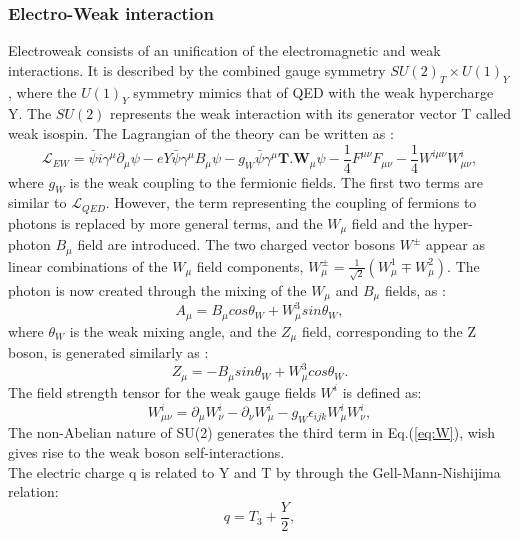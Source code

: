 \subsubsection{Electro-Weak interaction}
Electroweak consists of an unification of the electromagnetic and weak interactions. It is described by the combined gauge symmetry $SU(2)_{T}\times U(1)_{Y}$, where the $U(1)_{Y}$ symmetry mimics that of QED with the weak hypercharge Y. The $SU(2)$ represents the weak interaction with its generator vector T called weak isospin. The Lagrangian of the theory can be written as : 
\begin{equation}
    \mathcal{L}_{EW} = \bar{\psi}i\gamma^\mu\partial_\mu\psi -eY\bar{\psi}\gamma^{\mu}B_{\mu}\psi-g_{W}\bar{\psi}\gamma^{\mu}\textbf{T.W$_\mu$}\psi
    -\frac{1}{4}F^{\mu\nu}F_{\mu\nu} - \frac{1}{4}W^{i\mu\nu}W^i_{\mu\nu},
\end{equation}
where $g_{W}$ is the weak coupling to the fermionic fields. The first two terms are similar to $\mathcal{L}_{QED}$. However, the term representing the coupling of fermions to photons is replaced by more general terms, and the $W_{\mu}$ field and the hyper-photon $B_{\mu}$ field are introduced. The two charged vector bosons $W^\pm$ appear as linear combinations of the $W_{\mu}$ field components, $W^{\pm}_{\mu} = \frac{1}{\sqrt{2}}(W^1_{\mu}\mp W^2_{\mu})$. The photon is now created through the mixing of the $W_{\mu}$ and $B_{\mu}$ fields, as :
\begin{equation}
    A_{\mu} = B_{\mu}cos\theta_{W} + W^3_{\mu}sin\theta_{W},
\end{equation}
where $\theta_{W}$ is the weak mixing angle, and the $Z_{\mu}$ field, corresponding to the Z boson, is generated similarly as : 
\begin{equation}
     Z_{\mu} = -B_{\mu}sin\theta_{W} + W^3_{\mu}cos\theta_{W}.
\end{equation}
The field strength tensor for the weak gauge fields $W^i$ is defined as:
\begin{equation}
    W^{i}_{\mu\nu} = \partial_{\mu}W^i_{\nu} - \partial_{\nu}W^i_{\mu} - g_{W}\epsilon_{ijk}W^i_{\mu}W^i_{\nu},
    \label{eq:W}
\end{equation}
The non-Abelian nature of SU(2) generates the third term in Eq.(\ref{eq:W}), wish gives rise to the weak boson self-interactions. \\
The electric charge q is related to Y and T by through the Gell-Mann-Nishijima relation:
\begin{equation}
    q = T_3 + \frac{Y}{2},
\end{equation}
